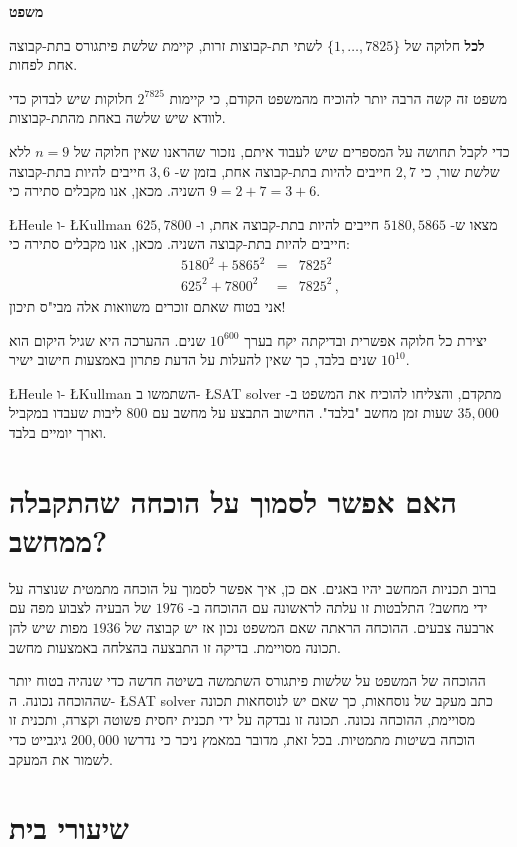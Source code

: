 \documentclass[12pt,a4paper]{article}
\begin{document}
\textbf{משפט}

\textbf{לכל}
חלוקה של 
$\{1,\ldots,7825\}$
לשתי תת-קבוצות זרות, קיימת שלשת פיתגורס בתת-קבוצה אחת לפחות.

משפט זה קשה הרבה יותר להוכיח מהמשפט הקודם, כי קיימות 
$2^{7825}$
חלוקות שיש לבדוק כדי לוודא שיש שלשה באחת מהתת-קבוצות.

כדי לקבל תחושה על המספרים שיש לעבוד איתם, נזכור שהראנו שאין חלוקה של
$n=9$
ללא שלשת שור, כי
$2,7$
חייבים להיות בתת-קבוצה אחת, בזמן ש-%
$3,6$
חייבים להיות בתת-קבוצה השניה. מכאן, אנו מקבלים סתירה כי
$9=2+7=3+6$.

\L{Heule}
ו-%
\L{Kullman}
מצאו ש-%
$5180,5865$
חייבים להיות בתת-קבוצה אחת, ו-%
$625,7800$
חייבים להיות בתת-קבוצה השניה. מכאן, אנו מקבלים סתירה כי:
\begin{eqnarray*}
5180^2 + 5865^2 &=& 7825^2\\
625^2 + 7800^2 &=& 7825^2\,,
\end{eqnarray*}
אני בטוח שאתם זוכרים משוואות אלה מבי"ס תיכון!

יצירת כל חלוקה אפשרית ובדיקתה יקח בערך
$10^{600}$
שנים. ההערכה היא שגיל היקום הוא 
$10^{10}$
שנים בלבד, כך שאין להעלות על הדעת פתרון באמצעות חישוב ישיר.

\L{Heule}
ו-%
\L{Kullman}
השתמשו ב-%
\L{SAT solver}
מתקדם, והצליחו להוכיח את המשפט ב-%
$35,000$
שעות זמן מחשב "בלבד". החישוב התבצע על מחשב עם 
$800$
ליבות שעבדו במקביל וארך יומיים בלבד.

\section{האם אפשר לסמוך על הוכחה שהתקבלה ממחשב?}

ברוב תכניות המחשב יהיו באגים. אם כן, איך אפשר לסמוך על הוכחה מתמטית שנוצרה על ידי מחשב? התלבטות זו עלתה לראשונה עם ההוכחה ב-%
$1976$
של הבעיה לצבוע מפה עם ארבעה צבעים. ההוכחה הראתה שאם המשפט נכון אז יש קבוצה של 
$1936$
מפות שיש להן תכונה מסויימת. בדיקה זו התבצעה בהצלחה באמצעות מחשב.

ההוכחה של המשפט על שלשות פיתגורס השתמשה בשיטה חדשה כדי שנהיה בטוח יותר שההוכחה נכונה. ה-%
\L{SAT solver}
כתב מעקב של נוסחאות, כך שאם יש לנוסחאות תכונה מסויימת, ההוכחה נכונה. תכונה זו נבדקה על ידי תכנית יחסית פשוטה וקצרה, ותכנית זו הוכחה בשיטות מתמטיות. בכל זאת, מדובר במאמץ ניכר כי נדרשו 
$200,000$
גיגבייט כדי לשמור את המעקב.

\section{שיעורי בית}
\end{document}
